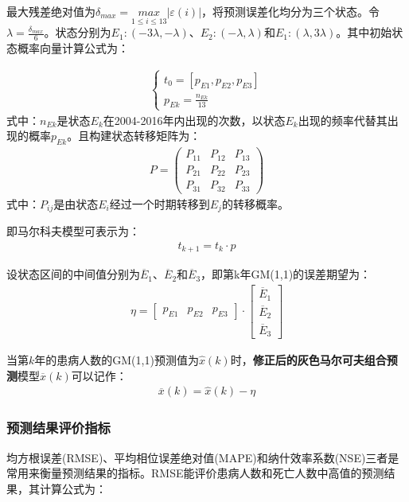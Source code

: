 \documentclass{whutmod}
\begin{document}
	    最大残差绝对值为$\delta _{max}=\underset{1\leqslant i\leqslant13 }{max}\left | \varepsilon(i) \right |$，将预测误差化均分为三个状态。令$\lambda =\frac{\delta _{max}}{6}$。状态分别为$E_{1}:(-3\lambda,-\lambda)$、$E_{2}:(-\lambda,\lambda)$和$E_{1}:(\lambda,3\lambda)$。其中初始状态概率向量计算公式为：
	    
	   \begin{gather}
	 \left\{\begin{matrix}
	 t_{0}=[p_{E1},p_{E2},p_{E3}]\\ 
	 p_{Ek}=\frac{n_{Ek}}{13}
	 \end{matrix}\right.
	  \end{gather}
	  式中：$n_{Ek}$是状态$E_{k}$在2004-2016年内出现的次数，以状态$E_{k}$出现的频率代替其出现的概率$p_{Ek}$。且构建状态转移矩阵为：
	   \begin{gather*}
	  P=\left(\begin{array}{lll}{P_{11}} & {P_{12}} & {P_{13}} \\ {P_{21}} & {P_{22}} & {P_{23}} \\ {P_{31}} & {P_{32}} & {P_{33}}\end{array}\right)
	  \end{gather*}
	   式中：$P_{ij}$是由状态$E_{i}$经过一个时期转移到$E_{j}$的转移概率。
	   
	   即马尔科夫模型可表示为：	  
	   \begin{gather}
	   t_{k+1}=t_{k} \cdot p
	  \end{gather}
	  
	  设状态区间的中间值分别为$\overline{E}_{1}$、$\overline{E}_{2}$和$\overline{E}_{3}$，即第k年GM(1,1)的误差期望为：
	   \begin{gather}
\eta =\begin{bmatrix}
p_{E1} & p_{E2} & p_{E3}
\end{bmatrix} \cdot\begin{bmatrix}
\overline{E}_{1}\\ 
\overline{E}_{2}\\ 
\overline{E}_{3}
\end{bmatrix}
	  \end{gather}
	  
	  当第$k$年的患病人数的GM(1,1)预测值为$\widehat{x}(k)$时，\textbf{修正后的灰色马尔可夫组合预测}模型$\overline{x}(k)$可以记作：
	     \begin{gather}
	     \overline{x}(k) =\widehat{x}(k)-\eta
	   \end{gather}
	   \subsubsection{预测结果评价指标}
	   均方根误差(RMSE)、平均相位误差绝对值(MAPE)和纳什效率系数(NSE)三者是常用来衡量预测结果的指标。RMSE能评价患病人数和死亡人数中高值的预测结果，其计算公式为：
\end{document}
